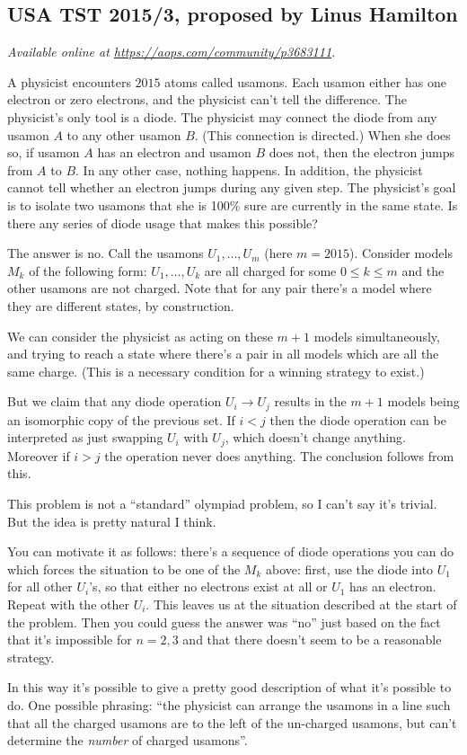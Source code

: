 \documentclass[11pt]{scrartcl}
\begin{document}
\subsection{USA TST 2015/3, proposed by Linus Hamilton}
\textsl{Available online at \url{https://aops.com/community/p3683111}.}
\begin{mdframed}[style=mdpurplebox,frametitle={Problem statement}]
A physicist encounters $2015$ atoms called usamons.
Each usamon either has one electron or zero electrons,
and the physicist can't tell the difference.
The physicist's only tool is a diode.
The physicist may connect the diode from any usamon $A$
to any other usamon $B$.  (This connection is directed.)
When she does so, if usamon $A$ has an electron and usamon $B$
does not, then the electron jumps from $A$ to $B$.
In any other case, nothing happens.  In addition,
the physicist cannot tell whether an electron jumps during any given step.
The physicist's goal is to isolate two usamons that she is 100\%
sure are currently in the same state.
Is there any series of diode usage that makes this possible?
\end{mdframed}
The answer is no.
Call the usamons $U_1, \dots, U_m$ (here $m=2015$).
Consider models $M_k$ of the following form:
$U_1, \dots, U_k$ are all charged for some $0 \le k \le m$
and the other usamons are not charged.
Note that for any pair there's a model
where they are different states, by construction.

We can consider the physicist as acting
on these $m+1$ models simultaneously,
and trying to reach a state where there's a pair
in all models which are all the same charge.
(This is a necessary condition for a winning strategy to exist.)

But we claim that any diode operation $U_i \to U_j$
results in the $m+1$ models being an isomorphic copy
of the previous set.
If $i < j$ then the diode operation can be interpreted
as just swapping $U_i$ with $U_j$, which doesn't change anything.
Moreover if $i > j$ the operation never does anything.
The conclusion follows from this.

\begin{remark*}
  This problem is not a ``standard'' olympiad problem,
  so I can't say it's trivial.
  But the idea is pretty natural I think.

  You can motivate it as follows:
  there's a sequence of diode operations
  you can do which forces the situation to be one of the $M_k$ above:
  first, use the diode into $U_1$ for all other $U_i$'s,
  so that either no electrons exist at all or $U_1$ has an electron.
  Repeat with the other $U_i$.
  This leaves us at the situation described at the start of the problem.
  Then you could guess the answer was ``no'' just based on the fact
  that it's impossible for $n=2,3$
  and that there doesn't seem to be a reasonable strategy.

  In this way it's possible to give a pretty good description
  of what it's possible to do.
  One possible phrasing:
  ``the physicist can arrange the usamons in a line such that
  all the charged usamons are to the left of the un-charged usamons,
  but can't determine the \emph{number} of charged usamons''.
\end{remark*}
\pagebreak
\end{document}
